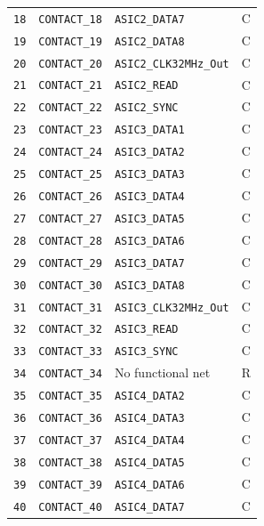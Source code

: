 \documentclass[10pt,a4paper]{article}
\begin{document}
\begin{longtable}{@{}P{15mm}P{42mm}P{92mm}P{10mm}@{}}
\nolinkurl{18} & \nolinkurl{CONTACT_18} & \nolinkurl{ASIC2_DATA7} & C \\
\nolinkurl{19} & \nolinkurl{CONTACT_19} & \nolinkurl{ASIC2_DATA8} & C \\
\nolinkurl{20} & \nolinkurl{CONTACT_20} & \nolinkurl{ASIC2_CLK32MHz_Out} & C \\
\nolinkurl{21} & \nolinkurl{CONTACT_21} & \nolinkurl{ASIC2_READ} & C \\
\nolinkurl{22} & \nolinkurl{CONTACT_22} & \nolinkurl{ASIC2_SYNC} & C \\
\nolinkurl{23} & \nolinkurl{CONTACT_23} & \nolinkurl{ASIC3_DATA1} & C \\
\nolinkurl{24} & \nolinkurl{CONTACT_24} & \nolinkurl{ASIC3_DATA2} & C \\
\nolinkurl{25} & \nolinkurl{CONTACT_25} & \nolinkurl{ASIC3_DATA3} & C \\
\nolinkurl{26} & \nolinkurl{CONTACT_26} & \nolinkurl{ASIC3_DATA4} & C \\
\nolinkurl{27} & \nolinkurl{CONTACT_27} & \nolinkurl{ASIC3_DATA5} & C \\
\nolinkurl{28} & \nolinkurl{CONTACT_28} & \nolinkurl{ASIC3_DATA6} & C \\
\nolinkurl{29} & \nolinkurl{CONTACT_29} & \nolinkurl{ASIC3_DATA7} & C \\
\nolinkurl{30} & \nolinkurl{CONTACT_30} & \nolinkurl{ASIC3_DATA8} & C \\
\nolinkurl{31} & \nolinkurl{CONTACT_31} & \nolinkurl{ASIC3_CLK32MHz_Out} & C \\
\nolinkurl{32} & \nolinkurl{CONTACT_32} & \nolinkurl{ASIC3_READ} & C \\
\nolinkurl{33} & \nolinkurl{CONTACT_33} & \nolinkurl{ASIC3_SYNC} & C \\
\nolinkurl{34} & \nolinkurl{CONTACT_34} & No functional net & R \\
\nolinkurl{35} & \nolinkurl{CONTACT_35} & \nolinkurl{ASIC4_DATA2} & C \\
\nolinkurl{36} & \nolinkurl{CONTACT_36} & \nolinkurl{ASIC4_DATA3} & C \\
\nolinkurl{37} & \nolinkurl{CONTACT_37} & \nolinkurl{ASIC4_DATA4} & C \\
\nolinkurl{38} & \nolinkurl{CONTACT_38} & \nolinkurl{ASIC4_DATA5} & C \\
\nolinkurl{39} & \nolinkurl{CONTACT_39} & \nolinkurl{ASIC4_DATA6} & C \\
\nolinkurl{40} & \nolinkurl{CONTACT_40} & \nolinkurl{ASIC4_DATA7} & C \\

\end{longtable}
\end{document}
